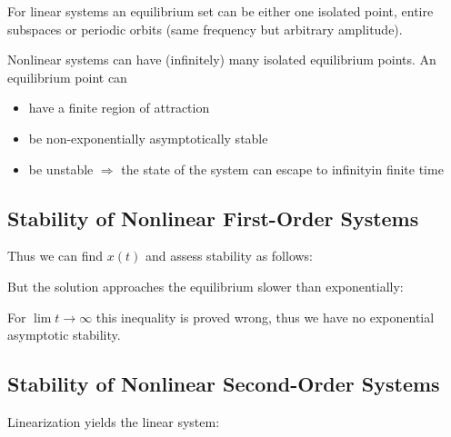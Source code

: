 \documentclass[10pt,a4paper]{scrartcl}
\begin{document}
\begin{multicols*}{3}
\finn

For linear systems an equilibrium set can be either one isolated point, entire subspaces or periodic orbits (same frequency but arbitrary amplitude).

Nonlinear systems can have (infinitely) many isolated equilibrium points. An equilibrium point can

\begin{itemize}
\ncompaq
\item have a finite region of attraction
\item be non-exponentially asymptotically stable
\item be unstable $\Rightarrow$ the state of the system can \glqq escape to infinity\grqq in finite time
\end{itemize}

\subsection{Stability of Nonlinear First-Order Systems}



Thus we can find $x(t)$ and assess stability as follows:



But the solution approaches the equilibrium slower than exponentially:


For $\lim t\rightarrow \infty$ this inequality is proved wrong, thus we have no exponential asymptotic stability.

\subsection{Stability of Nonlinear Second-Order Systems}


Linearization yields the linear system:



\end{multicols*}
\end{document}
